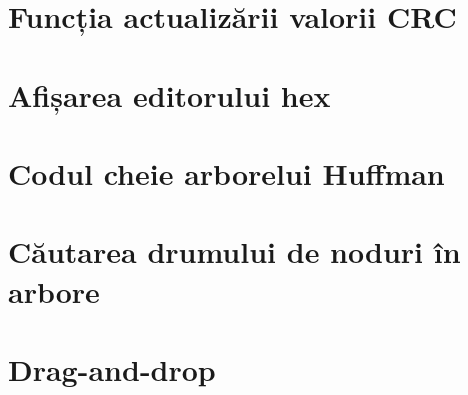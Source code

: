 \documentclass[a4paper,12pt]{report}
\begin{document}
\section{Funcția actualizării valorii CRC}\label{appendix:crc}

\section{Afișarea editorului hex}\label{appendix:draw_hex_grid}

\section{Codul cheie arborelui Huffman}\label{appendix:huffman_tree}

\section{Căutarea drumului de noduri în arbore}\label{appendix:node_path_search_impl}

\section{Drag-and-drop}\label{appendix:drag_and_drop}



\end{document}
